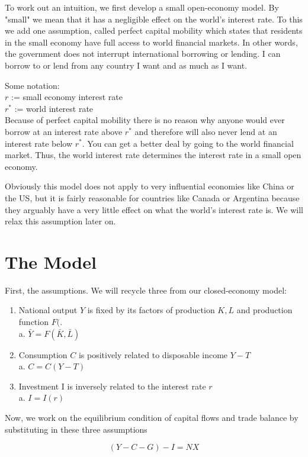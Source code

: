 \documentclass[10pt]{article}
\begin{document}
To work out an intuition, we first develop a small open-economy model. By "small" we mean that it has a negligible effect on the world's interest rate. To this we add one assumption, called perfect capital mobility which states that residents in the small economy have full access to world financial markets. In other words, the government does not interrupt international borrowing or lending. I can borrow to or lend from any country I want and as much as I want.

Some notation:\\
$r$ := small economy interest rate\\
$r^{*}$ := world interest rate\\
Because of perfect capital mobility there is no reason why anyone would ever borrow at an interest rate above $r^{*}$ and therefore will also never lend at an interest rate below $r^{*}$. You can get a better deal by going to the world financial market. Thus, the world interest rate determines the interest rate in a small open economy.

Obviously this model does not apply to very influential economies like China or the US, but it is fairly reasonable for countries like Canada or Argentina because they arguably have a very little effect on what the world's interest rate is. We will relax this assumption later on.

\section*{The Model}
First, the assumptions. We will recycle three from our closed-economy model:

\begin{enumerate}
  \item National output $Y$ is fixed by its factors of production $K, L$ and production function $F($.\\
a. $\bar{Y}=F(\bar{K}, \bar{L})$
  \item Consumption $C$ is positively related to disposable income $Y-T$\\
a. $C=C(Y-T)$
  \item Investment I is inversely related to the interest rate $r$\\
a. $I=I(r)$
\end{enumerate}

Now, we work on the equilibrium condition of capital flows and trade balance by substituting in these three assumptions

$$
(Y-C-G)-I=N X
$$
\end{document}

